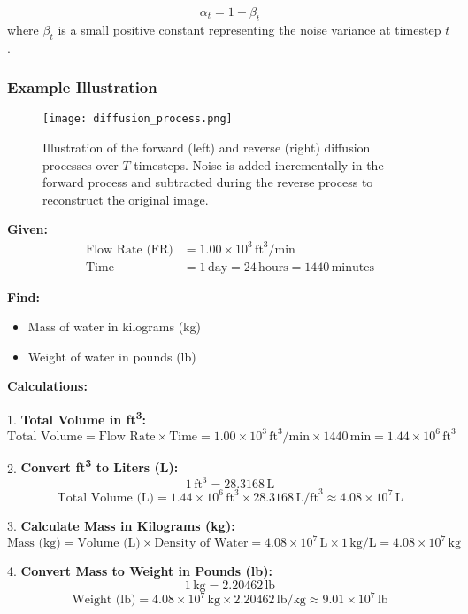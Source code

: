 \documentclass[11pt]{article}
\begin{document}
\begin{equation}
    \alpha_t = 1 - \beta_t
    \label{eq:alpha_schedule}
\end{equation}
where \( \beta_t \) is a small positive constant representing the noise variance at timestep \( t \).

\subsubsection*{Example Illustration}
\begin{figure}[h!]
    \centering
    \texttt{[image: diffusion\_process.png]}
    \caption{Illustration of the forward (left) and reverse (right) diffusion processes over \( T \) timesteps. Noise is added incrementally in the forward process and subtracted during the reverse process to reconstruct the original image.}
    \label{fig:diffusion_process}
\end{figure}

\textbf{Given:}
\begin{align*}
\text{Flow Rate (FR)} &= 1.00 \times 10^3 \, \text{ft}^3/\text{min} \\
\text{Time} &= 1 \, \text{day} = 24 \, \text{hours} = 1440 \, \text{minutes}
\end{align*}

\textbf{Find:}
\begin{itemize}
    \item Mass of water in kilograms (kg)
    \item Weight of water in pounds (lb)
\end{itemize}

\textbf{Calculations:}

1. \textbf{Total Volume in ft\textsuperscript{3}:}
\[
\text{Total Volume} = \text{Flow Rate} \times \text{Time} = 1.00 \times 10^3 \, \text{ft}^3/\text{min} \times 1440 \, \text{min} = 1.44 \times 10^6 \, \text{ft}^3
\]

2. \textbf{Convert ft\textsuperscript{3} to Liters (L):}
\[
1 \, \text{ft}^3 = 28.3168 \, \text{L}
\]
\[
\text{Total Volume (L)} = 1.44 \times 10^6 \, \text{ft}^3 \times 28.3168 \, \text{L/ft}^3 \approx 4.08 \times 10^7 \, \text{L}
\]

3. \textbf{Calculate Mass in Kilograms (kg):}
\[
\text{Mass (kg)} = \text{Volume (L)} \times \text{Density of Water} = 4.08 \times 10^7 \, \text{L} \times 1 \, \text{kg/L} = 4.08 \times 10^7 \, \text{kg}
\]

4. \textbf{Convert Mass to Weight in Pounds (lb):}
\[
1 \, \text{kg} = 2.20462 \, \text{lb}
\]
\[
\text{Weight (lb)} = 4.08 \times 10^7 \, \text{kg} \times 2.20462 \, \text{lb/kg} \approx 9.01 \times 10^7 \, \text{lb}
\]
\end{document}
